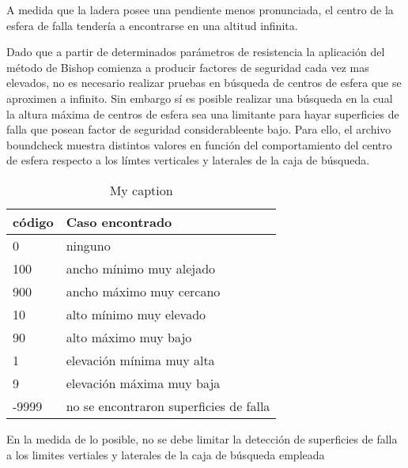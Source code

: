 A medida que la ladera posee una pendiente menos pronunciada, el centro de la esfera de falla tendería a encontrarse en una altitud infinita.

Dado que a partir de determinados parámetros de resistencia la aplicaci\'on del m\'etodo de Bishop comienza a producir factores de seguridad cada vez mas elevados, no es necesario realizar pruebas en b\'usqueda de centros de esfera que se aproximen a infinito.
Sin embargo s\'i es posible realizar una b\'usqueda en la cual la altura m\'axima de centros de esfera sea una limitante para hayar superficies de falla que posean factor de seguridad  considerableente bajo. Para ello, el archivo boundcheck muestra distintos valores en funci\'on del comportamiento del centro de esfera respecto a los l\'imtes verticales y laterales de la caja de b\'usqueda.

\begin{table}[]
\centering
\caption{My caption}
\label{my-label}
\begin{tabular}{ll}
\hline
\multicolumn{1}{|l|}{\textbf{c\'odigo}} & \multicolumn{1}{l|}{\textbf{Caso encontrado}} \\ \hline
0                                     & ninguno                                           \\
100                                   & ancho m\'inimo muy alejado                          \\
900                                   & ancho m\'aximo muy cercano                          \\
10                                    & alto m\'inimo muy elevado                           \\
90                                    & alto m\'aximo muy bajo                              \\
1                                     & elevaci\'on m\'inima muy alta                         \\
9                                     & elevaci\'on m\'axima muy baja                         \\
-9999                                 & no se encontraron superficies de falla           
\end{tabular}
\label{boundcheckTable}
\end{table}

En la medida de lo posible, no se debe limitar la detecci\'on de superficies de falla a los limites vertiales y laterales de la caja de b\'usqueda empleada
